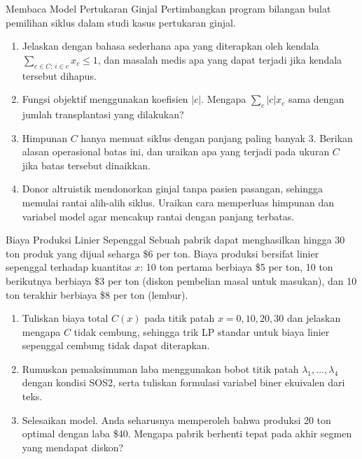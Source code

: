 \begin{ex}{Membaca Model Pertukaran Ginjal}{}
\label{ex:kidney-model}
 Pertimbangkan program bilangan bulat pemilihan siklus dalam studi kasus pertukaran ginjal.
\begin{enumerate}
\item Jelaskan dengan bahasa sederhana apa yang diterapkan oleh kendala $\sum_{c \in C:\, i \in c} x_c \leq 1$, dan masalah medis apa yang dapat terjadi jika kendala tersebut dihapus.
\item Fungsi objektif menggunakan koefisien $|c|$. Mengapa $\sum_{c} |c| x_c$ sama dengan jumlah transplantasi yang dilakukan?
\item Himpunan $C$ hanya memuat siklus dengan panjang paling banyak 3. Berikan alasan operasional batas ini, dan uraikan apa yang terjadi pada ukuran $C$ jika batas tersebut dinaikkan.
\item Donor altruistik mendonorkan ginjal tanpa pasien pasangan, sehingga memulai rantai alih-alih siklus. Uraikan cara memperluas himpunan dan variabel model agar mencakup rantai dengan panjang terbatas.
\end{enumerate}
\end{ex}


\begin{ex}{Biaya Produksi Linier Sepenggal}{}
\label{ex:pwl-challenge}
 Sebuah pabrik dapat menghasilkan hingga 30 ton produk yang dijual seharga \$6 per ton. Biaya produksi bersifat linier sepenggal terhadap kuantitas $x$: 10 ton pertama berbiaya \$5 per ton, 10 ton berikutnya berbiaya \$3 per ton (diskon pembelian masal untuk masukan), dan 10 ton terakhir berbiaya \$8 per ton (lembur).
\begin{enumerate}
\item Tuliskan biaya total $C(x)$ pada titik patah $x = 0, 10, 20, 30$ dan jelaskan mengapa $C$ tidak cembung, sehingga trik LP standar untuk biaya linier sepenggal cembung tidak dapat diterapkan.
\item Rumuskan pemaksimuman laba menggunakan bobot titik patah $\lambda_1, \dots, \lambda_4$ dengan kondisi SOS2, serta tuliskan formulasi variabel biner ekuivalen dari teks.
\item Selesaikan model. Anda seharusnya memperoleh bahwa produksi 20 ton optimal dengan laba \$40. Mengapa pabrik berhenti tepat pada akhir segmen yang mendapat diskon?
\end{enumerate}
\end{ex}

